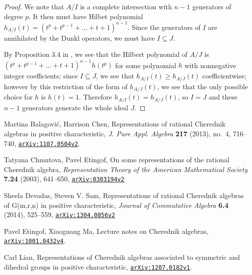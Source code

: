 \documentclass{article}
\numberwithin{equation}{section}
\newcommand{\arxiv}[1]{\href{http://arxiv.org/abs/#1}{{\tt arXiv:#1}}}
\begin{document}
\begin{proof} We note that $A/I$ is a complete intersection with $n-1$ generators of degree $p$. It then must have Hilbet polynomial $h_{A/I}(t)=(t^p+t^{p-1}+\dots+t+1)^{n-1}$. Since the generators of $I$ are annihilated by the Dunkl operators, we must have $I \subseteq J$. 

By Proposition 3.4 in \cite{BC1}, we see that the Hilbert polynomial of $A/J$ is $(t^p+t^{p-1}+\dots+t+1)^{n-1}h(t^p)$ for some polynomial $h$ with nonnegative integer coefficients; since $I \subseteq J$, we see that $h_{A/I}(t) \ge h_{A/J}(t)$ coefficientwise; however by this restriction of the form of $h_{A/J}(t)$, we see that the only possible choice for $h$ is $h(t)=1$. Therefore $h_{A/I}(t)=h_{A/J}(t)$, so $I=J$ and these $n-1$ generators generate the whole ideal $J$.

\end{proof}








\begin{thebibliography}{2}

\setlength{\itemsep}{-1mm}
\small

 Martina Balagovi\'c, Harrison Chen, Representations of rational Cherednik algebras in positive characteristic, {\it J. Pure Appl. Algebra} {\bf 217} (2013), no.~4, 716--740, \arxiv{1107.0504v2}.

 Tatyana Chmutova, Pavel Etingof, On some representations of the rational Cherednik algebra, {\it Representation Theory of the American Mathematical Society} {\bf 7.24} (2003), 641--650, \arxiv{0303194v2}

 Sheela Devadas, Steven V. Sam, Representations of rational Cherednik algebras of G(m,r,n) in positive characteristic, {\it Journal of Commutative Algebra} {\bf 6.4} (2014), 525--559, \arxiv{1304.0856v2}

 Pavel Etingof, Xiaoguang Ma, Lecture notes on Cherednik algebras, \arxiv{1001.0432v4}.

 Carl Lian, Representations of Cherednik algebras associated to symmetric and dihedral groups in positive characteristic, \arxiv{1207.0182v1}.

\end{thebibliography}
\end{document}
